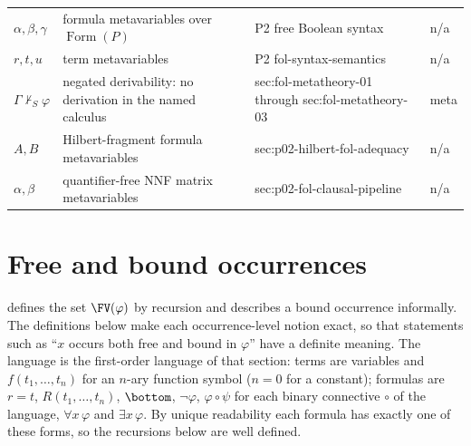 \begin{longtable}{@{}p{}p{}p{}p{}@{}}
\(\alpha,\allowbreak \beta,\allowbreak \gamma\) & formula metavariables over \(\operatorname{Form}(P)\) & P2 free Boolean syntax & n/a \\
\(r,\allowbreak t,\allowbreak u\) & term metavariables & P2 fol-\allowbreak{}syntax-\allowbreak{}semantics & n/a \\
\(\Gamma\nvdash_{S}\varphi\) & negated derivability: no derivation in the named calculus & sec:\allowbreak{}fol-\allowbreak{}metatheory-\allowbreak{}01 through sec:\allowbreak{}fol-\allowbreak{}metatheory-\allowbreak{}03 & meta \\
\(A,\allowbreak B\) & Hilbert-fragment formula metavariables & sec:\allowbreak{}p02-\allowbreak{}hilbert-\allowbreak{}fol-\allowbreak{}adequacy & n/a \\
\(\alpha,\allowbreak \beta\) & quantifier-free NNF matrix metavariables & sec:\allowbreak{}p02-\allowbreak{}fol-\allowbreak{}clausal-\allowbreak{}pipeline & n/a \\
\end{longtable}
\endgroup

\section{Free and bound occurrences}
\label{sec:p01-w02-p01-024-binding}

 defines the set \(\FV(\varphi)\) by
recursion and describes a bound occurrence informally.  The definitions
below make each occurrence-level notion exact, so that statements such as
``\(x\) occurs both free and bound in \(\varphi\)'' have a definite meaning.
The language is the first-order language of that section: terms are
variables and \(f(t_1,\ldots,t_n)\) for an \(n\)-ary function symbol
(\(n=0\) for a constant); formulas are \(r=t\), \(R(t_1,\ldots,t_n)\),
\(\bottom\), \(\neg\varphi\), \(\varphi\circ\psi\) for each binary
connective \(\circ\) of the language, \(\forall x\,\varphi\) and
\(\exists x\,\varphi\).  By unique readability each formula has exactly one
of these forms, so the recursions below are well defined.

